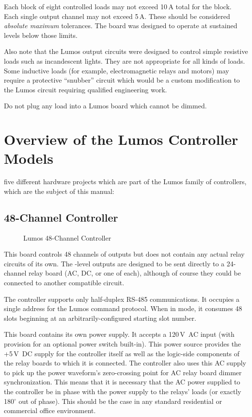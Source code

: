 \documentclass[letterpaper,twoside,onecolumn,openright,final]{memoir}
\begin{document}
Each block of eight controlled loads may not exceed 
10\,A total for the block.  
Each single output channel
may not exceed 5\,A.  These should be considered \emph{absolute maximum} tolerances.  The board was designed
to operate at sustained levels below those limits.

Also note that the Lumos output circuits were designed to control simple resistive loads such as
incandescent lights.  They are not appropriate for all kinds of loads.  Some inductive loads
(for example, electromagnetic relays and motors) may require a protective ``snubber'' circuit
which would be a custom modification to the Lumos circuit requiring qualified engineering work.
%

Do not plug any load into a Lumos board which cannot be dimmed.

\chapter{Overview of the Lumos Controller Models}
 five different hardware projects which are part of the Lumos
family of controllers, which are the subject of this manual:
\section{48-Channel Controller}
\begin{figure}
  \begin{center}
  \end{center}
  \caption{Lumos 48-Channel Controller}
\end{figure}
This board controls 48 channels of outputs but does not contain any actual relay circuits of its own.
The -level outputs are designed to be sent directly to a 24-channel relay board (AC, DC,
or one of each), although of course they could be connected to another compatible circuit.

The controller supports only half-duplex RS-485 communications.
It occupies a single address for the Lumos command protocol.  When in  mode, it consumes
48 slots beginning at an arbitrarily-configured starting slot number.

This board contains its own power supply.  It accepts a 120\,V~AC input (with provision for an
optional power switch built-in).  This power source provides the +5\,V~DC supply for the controller
itself as well as the logic-side components of the relay boards to which it is connected.  The controller
also uses this AC supply to pick up the power waveform's zero-crossing point for AC relay board
dimmer synchronization.  This means that it is necessary that the AC power supplied to the controller
be in phase with the power supply to the relays' loads (or exactly 180$^\circ$ out of phase).  This should
be the case in any standard residential or commercial office environment.
\end{document}
